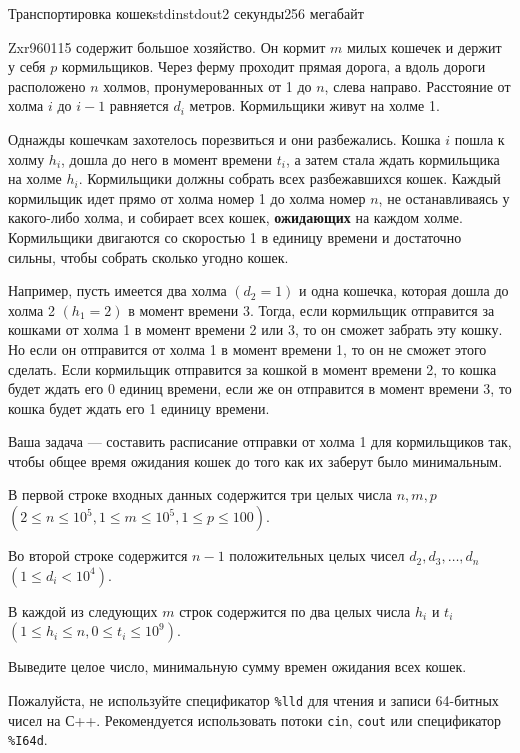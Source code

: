 \begin{problem}{Транспортировка кошек}{stdin}{stdout}{2 секунды}{256 мегабайт}

Zxr960115 содержит большое хозяйство. Он кормит $m$ милых кошечек и держит у себя $p$ кормильщиков. Через ферму проходит прямая дорога, а вдоль дороги расположено $n$ холмов, пронумерованных от 1 до $n$, слева направо. Расстояние от холма $i$ до $i-1$ равняется $d_i$ метров. Кормильщики живут на холме 1.

Однажды кошечкам захотелось порезвиться и они разбежались. Кошка $i$ пошла к холму $h_i$, дошла до него в момент времени $t_i$, а затем стала ждать кормильщика на холме $h_i$. Кормильщики должны собрать всех разбежавшихся кошек. Каждый кормильщик идет прямо от холма номер 1 до холма номер $n$, не останавливаясь у какого-либо холма, и собирает всех кошек, \textbf{ожидающих} на каждом холме. Кормильщики двигаются со скоростью 1 в единицу времени и достаточно сильны, чтобы собрать сколько угодно кошек.

Например, пусть имеется два холма $(d_2 = 1)$ и одна кошечка, которая дошла до холма 2 $(h_1 = 2)$ в момент времени 3. Тогда, если кормильщик отправится за кошками от холма 1 в момент времени 2 или 3, то он сможет забрать эту кошку. Но если он отправится от холма 1 в момент времени 1, то он не сможет этого сделать. Если кормильщик отправится за кошкой в момент времени 2, то кошка будет ждать его 0 единиц времени, если же он отправится в момент времени 3, то кошка будет ждать его 1 единицу времени.

Ваша задача --- составить расписание отправки от холма 1 для кормильщиков так, чтобы общее время ожидания кошек до того как их заберут было минимальным.

\InputFile
В первой строке входных данных содержится три целых числа $n, m, p$ $(2 \leq n \leq 10^5, 1 \leq m \leq 10^5, 1 \leq p \leq 100)$.

Во второй строке содержится $n-1$ положительных целых чисел $d_2, d_3, \dots, d_n$ $(1 \le d_i < 10^4)$.

В каждой из следующих $m$ строк содержится по два целых числа $h_i$ и $t_i$ $(1\leq h_i\leq n, 0\leq t_i\leq10^9)$.


\OutputFile
Выведите целое число, минимальную сумму времен ожидания всех кошек.

Пожалуйста, не используйте спецификатор \texttt{\%lld} для чтения и записи 64-битных чисел на С++. Рекомендуется использовать потоки \texttt{cin}, \texttt{cout} или спецификатор \texttt{\%I64d}.


\Examples

\begin{example}
%
\end{example}

\end{problem}
